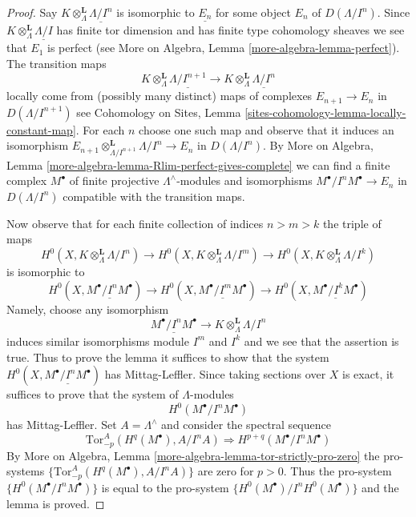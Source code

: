 \documentclass{stacks-project}
\theoremstyle{plain}
\theoremstyle{definition}
\theoremstyle{remark}
\numberwithin{equation}{subsection}
\begin{document}
\begin{proof}
Say $K \otimes_\Lambda^\mathbf{L} \underline{\Lambda/I^n}$ is isomorphic
to $\underline{E_n}$ for some object $E_n$ of $D(\Lambda/I^n)$.
Since $K \otimes_\Lambda^\mathbf{L} \underline{\Lambda/I}$ has
finite tor dimension and has finite type cohomology sheaves
we see that $E_1$ is perfect (see
More on Algebra, Lemma \ref{more-algebra-lemma-perfect}). The transition maps
$$
K \otimes_\Lambda^\mathbf{L} \underline{\Lambda/I^{n + 1}}
\to
K \otimes_\Lambda^\mathbf{L} \underline{\Lambda/I^n}
$$
locally come from (possibly many distinct) maps of complexes
$E_{n + 1} \to E_n$ in $D(\Lambda/I^{n + 1})$ see
Cohomology on Sites, Lemma \ref{sites-cohomology-lemma-locally-constant-map}.
For each $n$ choose one such map and observe that it induces
an isomorphism
$E_{n + 1} \otimes_{\Lambda/I^{n + 1}}^\mathbf{L} \Lambda/I^n \to E_n$
in $D(\Lambda/I^n)$. By
More on Algebra, Lemma \ref{more-algebra-lemma-Rlim-perfect-gives-complete}
we can find a finite complex $M^\bullet$ of finite projective
$\Lambda^\wedge$-modules and isomorphisms $M^\bullet/I^nM^\bullet \to E_n$
in $D(\Lambda/I^n)$ compatible with the transition maps.

\medskip\noindent
Now observe that for each finite collection of indices
$n > m > k$ the triple of maps
$$
H^0(X, K \otimes_\Lambda^\mathbf{L} \Lambda/I^n)
\to
H^0(X, K \otimes_\Lambda^\mathbf{L} \Lambda/I^m)
\to
H^0(X, K \otimes_\Lambda^\mathbf{L} \Lambda/I^k)
$$
is isomorphic to
$$
H^0(X, \underline{M^\bullet/I^nM^\bullet})
\to
H^0(X, \underline{M^\bullet/I^mM^\bullet})
\to
H^0(X, \underline{M^\bullet/I^kM^\bullet})
$$
Namely, choose any isomorphism
$$
\underline{M^\bullet/I^nM^\bullet} \to
K \otimes_\Lambda^\mathbf{L} \Lambda/I^n
$$
induces similar isomorphisms module $I^m$ and $I^k$ and we see that
the assertion is true. Thus to prove the lemma it suffices to show that
the system
$H^0(X, \underline{M^\bullet/I^nM^\bullet})$ has Mittag-Leffler.
Since taking sections over $X$ is exact, it suffices to prove that
the system of $\Lambda$-modules
$$
H^0(M^\bullet/I^nM^\bullet)
$$
has Mittag-Leffler. Set $A = \Lambda^\wedge$ and consider the spectral
sequence
$$
\text{Tor}_{-p}^A(H^q(M^\bullet), A/I^nA) \Rightarrow
H^{p + q}(M^\bullet/I^nM^\bullet)
$$
By More on Algebra, Lemma \ref{more-algebra-lemma-tor-strictly-pro-zero}
the pro-systems $\{\text{Tor}_{-p}^A(H^q(M^\bullet), A/I^nA)\}$ are zero
for $p > 0$. Thus the pro-system $\{H^0(M^\bullet/I^nM^\bullet)\}$
is equal to the pro-system $\{H^0(M^\bullet)/I^nH^0(M^\bullet)\}$
and the lemma is proved.
\end{proof}
\end{document}
